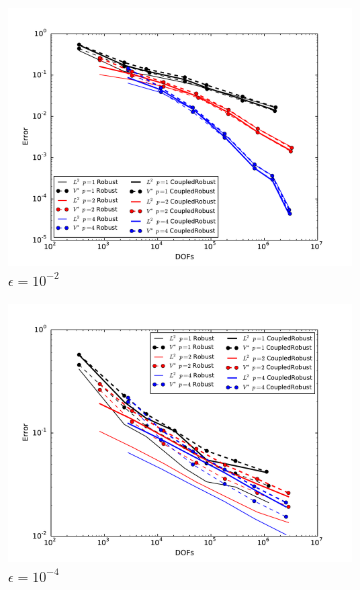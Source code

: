 \documentclass{article}
\begin{document}
\begin{figure}[ht]
\centering
\begin{subfigure}[t]{0.45\textwidth}
\centering
\includegraphics[width=\textwidth]{Confusion/Robustness/convergence_epsilon=1e-2.pdf}
\caption{$\epsilon=10^{-2}$}
\end{subfigure}
\begin{subfigure}[t]{0.45\textwidth}
\centering
\includegraphics[width=\textwidth]{Confusion/Robustness/convergence_epsilon=1e-4.pdf}
\caption{$\epsilon=10^{-4}$}
\end{subfigure}
\begin{subfigure}[t]{0.45\textwidth}
\centering

\end{subfigure}
\end{figure}
\end{document}
